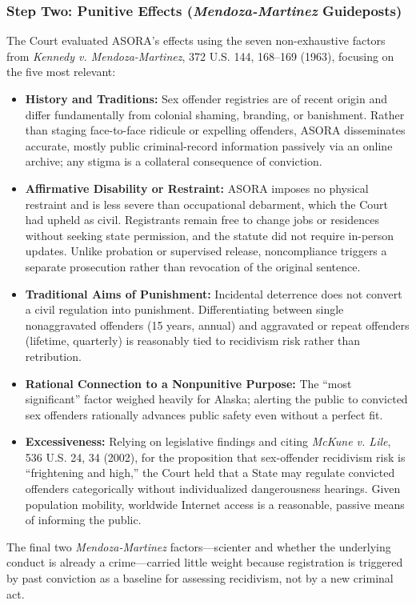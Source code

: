 \documentclass[12pt]{article}
\begin{document}
\subsubsection{Step Two: Punitive Effects (\textit{Mendoza-Martinez} Guideposts)}

The Court evaluated ASORA's effects using the seven non-exhaustive factors from \textit{Kennedy v. Mendoza-Martinez}, 372 U.S. 144, 168--169 (1963), focusing on the five most relevant:
\begin{itemize}
  \item \textbf{History and Traditions:} Sex offender registries are of recent origin and differ fundamentally from colonial shaming, branding, or banishment. Rather than staging face-to-face ridicule or expelling offenders, ASORA disseminates accurate, mostly public criminal-record information passively via an online archive; any stigma is a collateral consequence of conviction.
  \item \textbf{Affirmative Disability or Restraint:} ASORA imposes no physical restraint and is less severe than occupational debarment, which the Court had upheld as civil. Registrants remain free to change jobs or residences without seeking state permission, and the statute did not require in-person updates. Unlike probation or supervised release, noncompliance triggers a separate prosecution rather than revocation of the original sentence.
  \item \textbf{Traditional Aims of Punishment:} Incidental deterrence does not convert a civil regulation into punishment. Differentiating between single nonaggravated offenders (15 years, annual) and aggravated or repeat offenders (lifetime, quarterly) is reasonably tied to recidivism risk rather than retribution.
  \item \textbf{Rational Connection to a Nonpunitive Purpose:} The ``most significant'' factor weighed heavily for Alaska; alerting the public to convicted sex offenders rationally advances public safety even without a perfect fit.
  \item \textbf{Excessiveness:} Relying on legislative findings and citing \textit{McKune v. Lile}, 536 U.S. 24, 34 (2002), for the proposition that sex-offender recidivism risk is ``frightening and high,'' the Court held that a State may regulate convicted offenders categorically without individualized dangerousness hearings. Given population mobility, worldwide Internet access is a reasonable, passive means of informing the public.
\end{itemize}
The final two \textit{Mendoza-Martinez} factors---scienter and whether the underlying conduct is already a crime---carried little weight because registration is triggered by past conviction as a baseline for assessing recidivism, not by a new criminal act.
\end{document}
